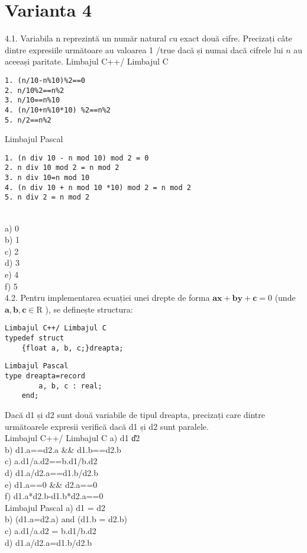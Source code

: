 \section*{Varianta 4}

4.1. Variabila n reprezintă un număr natural cu exact două cifre. Precizați câte dintre expresiile următoare au valoarea 1 /true dacă și numai dacă cifrele lui $n$ au aceeași paritate.
Limbajul C++/ Limbajul C
\begin{verbatim}
1. (n/10-n%10)%2==0
2. n/10%2==n%2
3. n/10==n%10
4. (n/10+n%10*10) %2==n%2
5. n/2==n%2
\end{verbatim}
Limbajul Pascal
\begin{verbatim}
1. (n div 10 - n mod 10) mod 2 = 0
2. n div 10 mod 2 = n mod 2
3. n div 10=n mod 10
4. (n div 10 + n mod 10 *10) mod 2 = n mod 2
5. n div 2 = n mod 2
\end{verbatim}
\\
a) 0
\\
b) 1
\\
c) 2
\\
d) 3
\\
e) 4
\\
f) 5
\\
4.2. Pentru implementarea ecuației unei drepte de forma $\mathbf{a x + b y}+\mathbf{c}=0$ (unde $\mathbf{a}, \mathbf{b}, \mathbf{c} \in \mathrm{R}$ ), se definește structura:
\begin{verbatim}
Limbajul C++/ Limbajul C
typedef struct
    {float a, b, c;}dreapta;
\end{verbatim}
\begin{verbatim}
Limbajul Pascal
type dreapta=record
        a, b, c : real;
    end;
\end{verbatim}
Dacă d1 și d2 sunt două variabile de tipul dreapta, precizați care dintre următoarele expresii verifică dacă d1 și d2 sunt paralele.
\\
Limbajul C++/ Limbajul C
a) d1 \|\| d2
\\
b) d1.a==d2.a \&\& d1.b==d2.b
\\
c) a.d1/a.d2==b.d1/b.d2
\\
d) d1.a/d2.a==d1.b/d2.b
\\
e) d1.a==0 \&\& d2.a==0
\\
f) d1.a*d2.b-d1.b*d2.a==0
\\
Limbajul Pascal
a) d1 = d2
\\
b) (d1.a=d2.a) and (d1.b = d2.b)
\\
c) a.d1/a.d2 = b.d1/b.d2
\\
d) d1.a/d2.a=d1.b/d2.b
